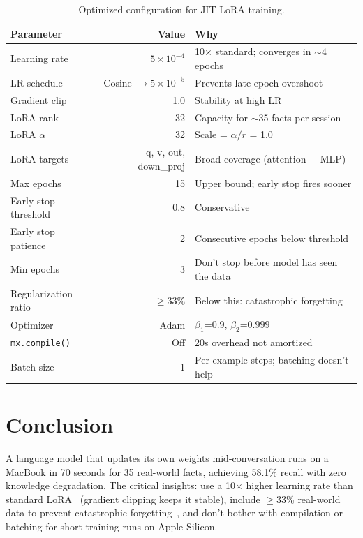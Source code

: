 \documentclass[11pt,a4paper]{article}
\begin{document}
\begin{table}[H]
\centering
\caption{Optimized configuration for JIT LoRA training.}
\begin{tabular}{lrl}
\toprule
\textbf{Parameter} & \textbf{Value} & \textbf{Why} \\
\midrule
Learning rate & $5 \times 10^{-4}$ & 10$\times$ standard; converges in $\sim$4 epochs \\
LR schedule & Cosine $\rightarrow 5 \times 10^{-5}$ & Prevents late-epoch overshoot \\
Gradient clip & 1.0 & Stability at high LR \\
LoRA rank & 32 & Capacity for $\sim$35 facts per session \\
LoRA $\alpha$ & 32 & Scale = $\alpha/r$ = 1.0 \\
LoRA targets & q, v, out, down\_proj & Broad coverage (attention + MLP) \\
Max epochs & 15 & Upper bound; early stop fires sooner \\
Early stop threshold & 0.8 & Conservative \\
Early stop patience & 2 & Consecutive epochs below threshold \\
Min epochs & 3 & Don't stop before model has seen the data \\
Regularization ratio & $\geq$33\% & Below this: catastrophic forgetting \\
Optimizer & Adam & $\beta_1$=0.9, $\beta_2$=0.999 \\
\texttt{mx.compile()} & Off & 20s overhead not amortized \\
Batch size & 1 & Per-example steps; batching doesn't help \\
\bottomrule
\end{tabular}
\end{table}

\section{Conclusion}

A language model that updates its own weights mid-conversation runs on a MacBook in 70 seconds for 35 real-world facts, achieving 58.1\% recall with zero knowledge degradation. The critical insights: use a 10$\times$ higher learning rate than standard LoRA~\cite{hu2021lora} (gradient clipping keeps it stable), include $\geq$33\% real-world data to prevent catastrophic forgetting~\cite{mccloskey1989catastrophic}, and don't bother with compilation or batching for short training runs on Apple Silicon.
\end{document}
